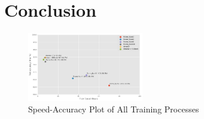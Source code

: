 \documentclass[conference]{IEEEtran}
\begin{document}
\section{Conclusion}
\begin{figure}[htbp]
    \centering
    \includegraphics[width=0.45\textwidth]{figure/acc_speed.png}
    \caption{Speed-Accuracy Plot of All Training Processes}
    \label{fig:denoise}
\end{figure}

\end{document}
